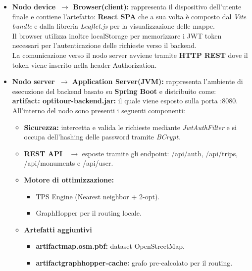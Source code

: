 \begin{itemize}
    \item \textbf{Nodo \guillemotleft device\guillemotright \ $\to$ Browser(client):} rappresenta il dispositivo dell'utente finale e contiene l'artefatto: \textbf{React SPA} che a sua volta è composto dal \textit{Vite bundle} e dalla libreria \textit{Leaflet.js} per la visualizzazione delle mappe.\\
    Il browser utilizza inoltre localStorage per memorizzare i JWT token necessari per l'autenticazione delle richieste verso il backend.\\
    La comunicazione verso il nodo server avviene tramite \textbf{HTTP REST } dove il token viene inserito nella header Authorization.
    
    \item \textbf{Nodo \guillemotleft server\guillemotright \ $\to$ Application Server(JVM):} rappresenta l'ambiente di esecuzione del backend basato su \textbf{Spring Boot} e distribuito come:\\
    \textbf{\guillemotleft artifact\guillemotright: optitour-backend.jar:} il quale viene esposto sulla porta :8080.\\
    All'interno del nodo sono presenti i seguenti componenti:
    \begin{itemize}
            \item \textbf{Sicurezza:} intercetta e valida le richieste mediante \textit{JwtAuthFilter} e si occupa dell'hashing delle password tramite \textit{BCrypt}.
            \item \textbf{REST API \ $\to$} esposte tramite gli endpoint: /api/auth, /api/trips,  /api/monuments e /api/user.
            \item \textbf{Motore di ottimizzazione:}
            \begin{itemize}
                \item TPS Engine (Nearest neighbor + 2-opt).
                \item GraphHopper per il routing locale.
            \end{itemize}
            \item  \textbf{Artefatti aggiuntivi}
            \begin{itemize}
                \item \textbf{\guillemotleft artifact\guillemotright map.osm.pbf:} dataset OpenStreetMap.
                \item \textbf{\guillemotleft artifact\guillemotright graphhopper-cache:} grafo pre-calcolato per il routing.

\end{itemize}
\end{itemize}
\end{itemize}
